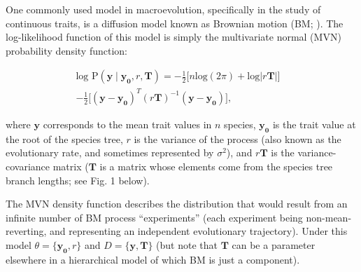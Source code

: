 \documentclass[oneside]{article}
\begin{document}
\begin{tcolorbox}[breakable, width=\textwidth, colback=gray!10, boxrule=0pt,
  title=Box 1: Models with well-known parametric \emph{pdf}'s, fonttitle=\bfseries]
  \small 
  One commonly used model in macroevolution, specifically in the study
of continuous traits, is a diffusion model known as
Brownian motion (BM; \citealt{felsenstein73}).
The log-likelihood function of this model is simply the multivariate
normal (MVN) probability density function:

\begin{equation}
  \begin{split}
    \text{log P}(\mathbf{y} \mid \mathbf{y_0}, r, \mathbf{T}) = -\frac{1}{2} \Big[ n\text{log}(2\pi) + \text{log}|r \mathbf{T}| \Big] & \\
    -\frac{1}{2} \Big[ (\mathbf{y} - \mathbf{y_0})^T (r \mathbf{T})^{-1} (\mathbf{y} - \mathbf{y_0}) \Big],
  \label{eq:bm}
  \end{split}
\end{equation}

\noindent where $\mathbf{y}$ corresponds to the mean trait values in $n$ species,
$\mathbf{y_0}$ is the trait value at the root of the species tree, $r$ is the variance of the process
(also known as the evolutionary rate, and sometimes represented by $\sigma^2$), and $r\mathbf{T}$ is the
variance-covariance matrix ($\mathbf{T}$ is a matrix whose elements
come from the species tree branch lengths; see Fig. 1 below).

\vspace{.25cm}
The MVN density function describes the distribution that would result from an infinite
number of BM process ``experiments'' (each experiment being non-mean-reverting, and
representing an independent evolutionary trajectory).
Under this model $\theta = \{\mathbf{y_0},
r\}$ and $D = \{\mathbf{y, \mathbf{T}} \}$ (but note that $\mathbf{T}$ can
be a parameter elsewhere in a hierarchical model of which BM is just a
component).


\end{tcolorbox}
\end{document}

